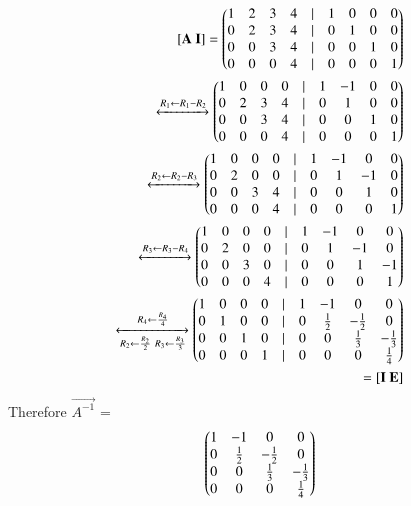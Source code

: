 \documentclass[journal,12pt,twocolumn]{IEEEtran}
\begin{document}
\begin{align}
	\mathbf{[A \ I]} = \begin{pmatrix} 1 & 2 & 3 & 4 &| & 1 & 0 & 0 & 0 \\
				0 & 2 & 3 & 4 &| & 0 & 1 & 0 & 0 \\
				0 & 0 & 3 & 4 &| & 0 & 0 & 1 & 0 \\
				0 & 0 & 0 & 4 &| & 0 & 0 & 0 & 1 \end{pmatrix}\\
			\xleftrightarrow[]{R_1 \leftarrow R_1 - R_2}
			\begin{pmatrix} 1 & 0 & 0 & 0 &| & 1 & -1 & 0 & 0 \\
                                0 & 2 & 3 & 4 &| & 0 & 1 & 0 & 0 \\
                                0 & 0 & 3 & 4 &| & 0 & 0 & 1 & 0 \\
                                0 & 0 & 0 & 4 &| & 0 & 0 & 0 & 1 \end{pmatrix}\\
			\xleftrightarrow[]{R_2 \leftarrow R_2 - R_3}
                        \begin{pmatrix} 1 & 0 & 0 & 0 &| & 1 & -1 & 0 & 0 \\
                                0 & 2 & 0 & 0 &| & 0 & 1 & -1 & 0 \\
                                0 & 0 & 3 & 4 &| & 0 & 0 & 1 & 0 \\
                                0 & 0 & 0 & 4 &| & 0 & 0 & 0 & 1 \end{pmatrix}\\
			\xleftrightarrow[]{R_3 \leftarrow R_3 - R_4}
                        \begin{pmatrix} 1 & 0 & 0 & 0 &| & 1 & -1 & 0 & 0 \\
                                0 & 2 & 0 & 0 &| & 0 & 1 & -1 & 0 \\
                                0 & 0 & 3 & 0 &| & 0 & 0 & 1 & -1 \\
                                0 & 0 & 0 & 4 &| & 0 & 0 & 0 & 1 \end{pmatrix}\\
			\xleftrightarrow[R_2 \leftarrow \frac{R_2}{2} \ R_3 \leftarrow \frac{R_3}{3}]
			{R_4 \leftarrow \frac{R_4}{4}}
                        \begin{pmatrix} 1 & 0 & 0 & 0 &| & 1 & -1 & 0 & 0 \\
				0 & 1 & 0 & 0 &| & 0 & \frac{1}{2} & -\frac{1}{2} & 0 \\
				0 & 0 & 1 & 0 &| & 0 & 0 & \frac{1}{3} & -\frac{1}{3} \\
				0 & 0 & 0 & 1 &| & 0 & 0 & 0 & \frac{1}{4}\end{pmatrix} \\ 
			= \mathbf{[I \ E]}
\end{align}
Therefore $\vec{A^{-1}}$ =
\begin{align}
	\begin{pmatrix} 1 & -1 & 0 & 0 \\
                0 & \frac{1}{2} & -\frac{1}{2} & 0 \\
                0 & 0 & \frac{1}{3} & -\frac{1}{3} \\
                0 & 0 & 0 & \frac{1}{4}\end{pmatrix} 
\end{align}
\end{document}
